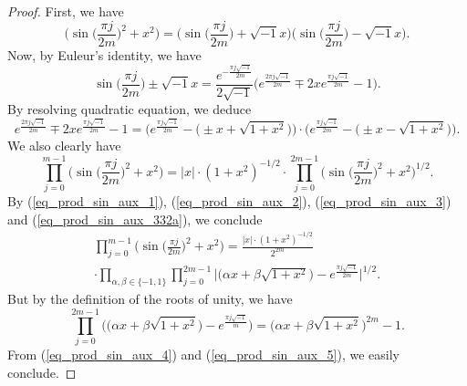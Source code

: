 \documentclass[12pt]{article}
\numberwithin{equation}{section}
\theoremstyle{theorem}
\theoremstyle{definition}
\theoremstyle{remark}
\newcommand{\imun} {\sqrt{-1}}
\begin{document}
		\begin{proof}
			First, we have
			\begin{equation}\label{eq_prod_sin_aux_1}
				\Big( \sin \Big( \frac{\pi j }{2m} \Big)^2 + x^2 \Big)
				=
				\Big( \sin \Big( \frac{\pi j }{2m} \Big) + \imun x \Big)
				\Big( \sin \Big( \frac{\pi j }{2m} \Big) - \imun x \Big).
			\end{equation}
			Now, by Euleur's identity, we have
			\begin{equation}\label{eq_prod_sin_aux_2}
				\sin \Big( \frac{\pi j }{2m} \Big) \pm \imun x 
				= 
				\frac{e^{-\frac{\pi j \imun}{2m}}}{2 \imun} 
				\Big(
					e^{\frac{2 \pi j \imun}{2m}}
					\mp
					2x
					e^{\frac{\pi j \imun}{2m}}
					-
					1
				\Big).
			\end{equation}
			By resolving quadratic equation, we deduce
			\begin{equation}\label{eq_prod_sin_aux_3}
				e^{\frac{2 \pi j \imun}{2m}}
				\mp
				2x
				e^{\frac{\pi j \imun}{2m}}
				-
				1
				=
				\Big(
					e^{\frac{\pi j \imun}{2m}} 
					- 
					\big( 
						\pm x + \sqrt{1 + x^2}
					\big)
				\Big)
				\cdot
				\Big(
					e^{\frac{\pi j \imun}{2m}} 
					- 
					\big( 
						\pm x - \sqrt{1 + x^2}
					\big)
				\Big).
			\end{equation}
			We also clearly have 
			\begin{equation}\label{eq_prod_sin_aux_332a}
				\prod_{j = 0}^{m-1} \Big( \sin \Big( \frac{\pi j }{2m} \Big)^2 + x^2 \Big) 
				= 
				|x| 
				\cdot
				(1 + x^2)^{-1/2}
				\cdot
				\prod_{j = 0}^{2m-1} \Big( \sin \Big( \frac{\pi j }{2m} \Big)^2 + x^2 \Big)^{1/2}.
			\end{equation}
			By (\ref{eq_prod_sin_aux_1}), (\ref{eq_prod_sin_aux_2}),  (\ref{eq_prod_sin_aux_3}) and  (\ref{eq_prod_sin_aux_332a}), we conclude
			\begin{multline}\label{eq_prod_sin_aux_4}
				\prod_{j = 0}^{m-1} \Big( \sin \Big( \frac{\pi j }{2m} \Big)^2 + x^2 \Big)
				=
				\frac{|x| 
				\cdot
				(1 + x^2)^{-1/2}}{2^{2m}} 
				\\
				\cdot
				\prod_{\alpha, \beta \in \{-1, 1\}}				
				\prod_{j = 0}^{2m-1}
				\Big|
					\big( 
						\alpha x + \beta \sqrt{1 + x^2}
					\big)
					- 
					e^{\frac{\pi j \imun}{2m}} 
				\Big|^{1/2}.
			\end{multline}
			But by the definition of the roots of unity, we have
			\begin{equation}\label{eq_prod_sin_aux_5}
				\prod_{j = 0}^{2m-1}
				\Big(
					\big( 
						\alpha x + \beta \sqrt{1 + x^2}
					\big)
					-
					e^{\frac{\pi j \imun}{m}} 
				\Big)
				=
					\big( 
						\alpha x + \beta \sqrt{1 + x^2}
					\big)^{2m}
					-
					1.
			\end{equation}
			From (\ref{eq_prod_sin_aux_4}) and (\ref{eq_prod_sin_aux_5}), we easily conclude.
		\end{proof}
\end{document}
